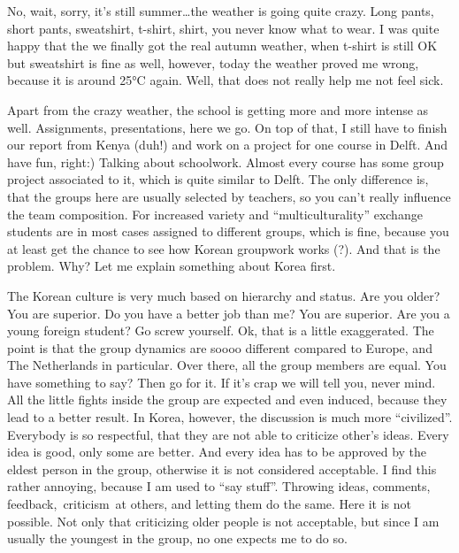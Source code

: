 \begin{post}
	\begin{content}
No, wait, sorry, it's still summer{\ldots}the weather is going quite crazy. Long pants, short pants, sweatshirt, t-shirt, shirt, you never know what to wear. I was quite happy that the we finally got the real autumn weather, when t-shirt is still OK but sweatshirt is fine as well, however, today the weather proved me wrong, because it is around 25°C again. Well, that does not really help me not feel sick.

Apart from the crazy weather, the school is getting more and more intense as well. Assignments, presentations, here we go. On top of that, I still have to finish our report from Kenya (duh!) and work on a project for one course in Delft. And have fun, right:) Talking about schoolwork. Almost every course has some group project associated to it, which is quite similar to Delft. The only difference is, that the groups here are usually selected by teachers, so you can't really influence the team composition. For increased variety and ``multiculturality'' exchange students are in most cases assigned to different groups, which is fine, because you at least get the chance to see how Korean groupwork works (?). And that is the problem. Why? Let me explain something about Korea first.

The Korean culture is very much based on hierarchy and status. Are you older? You are superior. Do you have a better job than me? You are superior. Are you a young foreign student? Go screw yourself. Ok, that is a little exaggerated. The point is that the group dynamics are soooo different compared to Europe, and The Netherlands in particular. Over there, all the group members are equal. You have something to say? Then go for it. If it's crap we will tell you, never mind. All the little fights inside the group are expected and even induced, because they lead to a better result. In Korea, however, the discussion is much more ``civilized''. Everybody is so respectful, that they are not able to criticize other's ideas. Every idea is good, only some are better. And every idea has to be approved by the eldest person in the group, otherwise it is not considered acceptable. I find this rather annoying, because I am used to ``say stuff''. Throwing ideas, comments, feedback, criticism at others, and letting them do the same. Here it is not possible. Not only that criticizing older people is not acceptable, but since I am usually the youngest in the group, no one expects me to do so.


\end{content}
\end{post}
